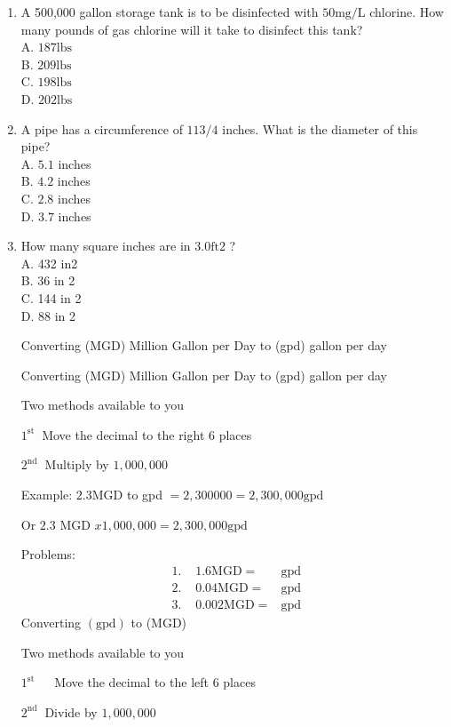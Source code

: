 \begin{enumerate}
  \item A 500,000 gallon storage tank is to be disinfected with $50 \mathrm{mg} / \mathrm{L}$ chlorine. How many pounds of gas chlorine will it take to disinfect this tank?\\
A. $187 \mathrm{lbs}$\\
B. $209 \mathrm{lbs}$\\
C. $198 \mathrm{lbs}$\\
D. $202 \mathrm{lbs}$

  \item A pipe has a circumference of $113 / 4$ inches. What is the diameter of this pipe?\\
A. $5.1$ inches\\
B. $4.2$ inches\\
C. $2.8$ inches\\
D. $3.7$ inches

  \item How many square inches are in $3.0 \mathrm{ft} 2$ ?\\
A. 432 in2\\
B. 36 in 2\\
C. 144 in 2\\
D. 88 in 2



Converting (MGD) Million Gallon per Day to (gpd) gallon per day

Converting (MGD) Million Gallon per Day to (gpd) gallon per day

Two methods available to you

$1^{\text {st }}$ Move the decimal to the right 6 places

$2^{\text {nd }}$ Multiply by $1,000,000$

Example: $2.3 \mathrm{MGD}$ to gpd $=2,300000=2,300,000 \mathrm{gpd}$

Or $2.3$ MGD $x 1,000,000=2,300,000 \mathrm{gpd}$

Problems:
$$
\begin{array}{lll}
\text { 1. } & 1.6 \mathrm{MGD}= & \mathrm{gpd} \\
\text { 2. } & 0.04 \mathrm{MGD}= & \mathrm{gpd} \\
\text { 3. } & 0.002 \mathrm{MGD}= & \mathrm{gpd}
\end{array}
$$
Converting $(\mathrm{gpd})$ to (MGD)

Two methods available to you

$1^{\text {st }} \quad$ Move the decimal to the left 6 places

$2^{\text {nd }}$ Divide by $1,000,000$


\end{enumerate}
